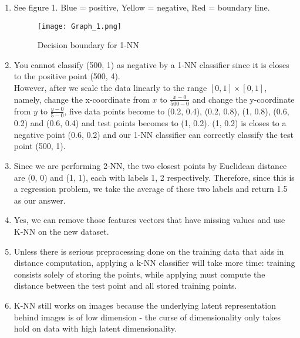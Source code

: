 \documentclass[11pt]{article}
\begin{document}
    \begin{enumerate}
        \item See figure 1. Blue = positive, Yellow = negative, Red = boundary line.
        \begin{figure}[h!]
            \texttt{[image: Graph\_1.png]}
            \centering
            \caption{Decision boundary for 1-NN }
        \end{figure}

        \item You cannot classify (500, 1) as negative by a 1-NN classifier since it is closes to the positive point (500, 4).\\
        However, after we scale the data linearly to the range $[0,1] \times [0,1]$, namely, change the x-coordinate from $x$ to $\frac{x - 0}{500 - 0}$ and change the y-coordinate from $y$ to $\frac{y - 0}{5 - 0}$, five data points become to (0.2, 0.4), (0.2, 0.8), (1, 0.8), (0.6, 0.2) and (0.6, 0.4) and test points becomes to (1, 0.2). (1, 0.2) is closes to a negative point (0.6, 0.2) and our 1-NN classifier can correctly classify the test point (500, 1).
        \item Since we are performing 2-NN, the two closest points by Euclidean distance are (0, 0) and (1, 1), each with labels 1, 2 respectively. Therefore, since this is a regression problem, we take the average of these two labels and return 1.5 as our answer.
        \item Yes, we can remove those features vectors that have missing values and use K-NN on the new dataset.
        \item Unless there is serious preprocessing done on the training data that aids in distance computation,
              applying a k-NN classifier will take more time: training consists solely of storing the points, while
              applying must compute the distance between the test point and all stored training points.

        \item K-NN still works on images because the underlying latent representation behind images is of low dimension - the curse of dimensionality only takes hold on data with high latent dimensionality.

    \end{enumerate}
\end{document}
